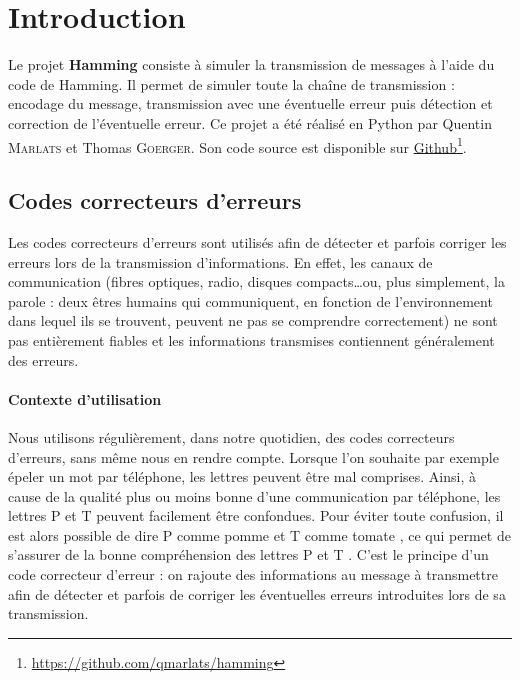 \documentclass[a4paper]{article}
\title{
  Hamming \\\vskip0.5em
  \large Documentation
}
\date{}
\author{Quentin \textsc{Marlats} -- Thomas \textsc{Goerger}}
\numberwithin{equation}{section}
\newcommand\footnoteurl[2]{\href{#1}{#2}\footnote{\url{#1}}}
\theoremstyle{definition}
\begin{document}
\maketitle
\tableofcontents

\thispagestyle{empty}
\clearpage

\setcounter{page}{1}


\section{Introduction}

Le projet \textbf{Hamming} consiste à simuler la transmission de messages à l'aide du code de Hamming. Il permet de simuler toute la chaîne de transmission : encodage du message, transmission avec une éventuelle erreur puis détection et correction de l'éventuelle erreur. Ce projet a été réalisé en Python par Quentin \textsc{Marlats} et Thomas \textsc{Goerger}. Son code source est disponible sur \footnoteurl{https://github.com/qmarlats/hamming}{Github}.

\subsection{Codes correcteurs d'erreurs}

Les codes correcteurs d'erreurs sont utilisés afin de détecter et parfois corriger les erreurs lors de la transmission d'informations. En effet, les canaux de communication (fibres optiques, radio, disques compacts\ldots ou, plus simplement, la parole : deux êtres humains qui communiquent, en fonction de l'environnement dans lequel ils se trouvent, peuvent ne pas se comprendre correctement) ne sont pas entièrement fiables et les informations transmises contiennent généralement des erreurs.

\paragraph{Contexte d'utilisation} Nous utilisons régulièrement, dans notre quotidien, des codes correcteurs d'erreurs, sans même nous en rendre compte. Lorsque l'on souhaite par exemple épeler un mot par téléphone, les lettres peuvent être mal comprises. Ainsi, à cause de la qualité plus ou moins bonne d'une communication par téléphone, les lettres \og P \fg{} et \og T \fg{} peuvent facilement être confondues. Pour éviter toute confusion, il est alors possible de dire \og P comme pomme \fg{} et \og T comme tomate \fg{}, ce qui permet de s'assurer de la bonne compréhension des lettres \og P \fg{} et \og T \fg{}. C'est le principe d'un code correcteur d'erreur : on rajoute des informations au message à transmettre afin de détecter et parfois de corriger les éventuelles erreurs introduites lors de sa transmission.
\end{document}
